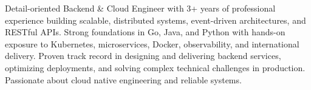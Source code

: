 

\begin{cvparagraph}

Detail-oriented Backend \& Cloud Engineer with 3+ years of professional experience building scalable, distributed systems, event-driven architectures, and RESTful APIs. Strong foundations in Go, Java, and Python with hands-on exposure to Kubernetes, microservices, Docker, observability, and international delivery. Proven track record in designing and delivering backend services, optimizing deployments, and solving complex technical challenges in production. Passionate about cloud native engineering and reliable systems.
\end{cvparagraph}